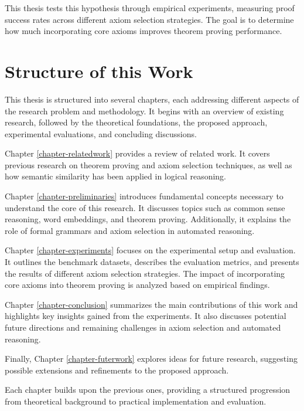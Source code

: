 \documentclass[english,version-2020-11]{uzl-thesis}
\begin{document}
This thesis tests this hypothesis through empirical experiments, measuring proof success rates across different axiom selection strategies. The goal is to determine how much incorporating core axioms improves theorem proving performance.

\section{Structure of this Work}

This thesis is structured into several chapters, each addressing different aspects of the research problem and methodology. It begins with an overview of existing research, followed by the theoretical foundations, the proposed approach, experimental evaluations, and concluding discussions.

Chapter \ref{chapter-relatedwork} provides a review of related work. It covers previous research on theorem proving and axiom selection techniques, as well as how semantic similarity has been applied in logical reasoning.

Chapter \ref{chapter-preliminaries} introduces fundamental concepts necessary to understand the core of this research. It discusses topics such as common sense reasoning, word embeddings, and theorem proving. Additionally, it explains the role of formal grammars and axiom selection in automated reasoning.

Chapter \ref{chapter-experiments} focuses on the experimental setup and evaluation. It outlines the benchmark datasets, describes the evaluation metrics, and presents the results of different axiom selection strategies. The impact of incorporating core axioms into theorem proving is analyzed based on empirical findings.

Chapter \ref{chapter-conclusion} summarizes the main contributions of this work and highlights key insights gained from the experiments. It also discusses potential future directions and remaining challenges in axiom selection and automated reasoning.

Finally, Chapter \ref{chapter-futerwork} explores ideas for future research, suggesting possible extensions and refinements to the proposed approach.

Each chapter builds upon the previous ones, providing a structured progression from theoretical background to practical implementation and evaluation.

\end{document}
